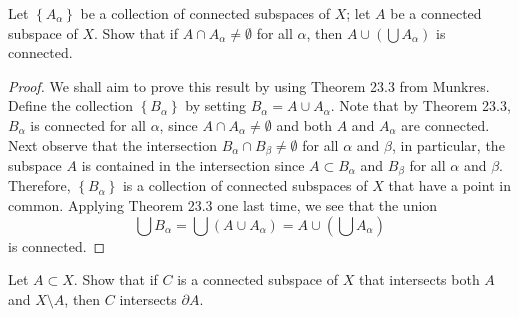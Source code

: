 \begin{problem}[Munkres \S23, Ex.\,3]
Let $\left\{A_\alpha\right\}$ be a collection of connected
subspaces of $X$; let $A$ be a connected subspace of $X$. Show
that if $A\cap A_\alpha\neq\emptyset$ for all $\alpha$, then
$A\cup\left(\bigcup A_\alpha\right)$ is connected.
\end{problem}
\begin{proof}
We shall aim to prove this result by using Theorem 23.3 from
Munkres. Define the collection $\left\{B_\alpha\right\}$ by
setting $B_\alpha=A\cup A_\alpha$. Note that by Theorem 23.3,
$B_\alpha$ is connected for all $\alpha$, since $A\cap
A_\alpha\neq\emptyset$ and both $A$ and $A_\alpha$ are
connected. Next observe that the intersection $B_\alpha\cap
B_\beta\neq\emptyset$ for all $\alpha$ and $\beta$, in
particular, the subspace $A$ is contained in the intersection
since $A\subset B_\alpha$ and $B_\beta$ for all $\alpha$ and
$\beta$. Therefore, $\left\{B_\alpha\right\}$ is a collection of
connected subspaces of $X$ that have a point in common. Applying
Theorem 23.3 one last time, we see that the union
\[
\bigcup B_\alpha=\bigcup\left(A\cup
  A_\alpha\right)=A\cup\left(\bigcup A_\alpha\right)
\]
is connected.
\end{proof}
\newpage
\begin{problem}[Munkres \S23, Ex.\,6]
Let $A\subset X$. Show that if $C$ is a connected subspace of $X$
that intersects both $A$ and $X\setminus A$, then $C$ intersects
$\partial A$.
\end{problem}
